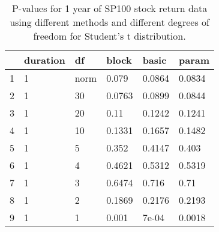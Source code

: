 \begin{table}[ht]
\centering
\caption{P-values for 1 year of SP100 stock return data using different 
  methods
  and different degrees of freedom for Student's t distribution.} 
\label{table:SP1001}
\begin{tabular}{rlllll}
  \hline
 & duration & df & block & basic & param \\ 
  \hline
1 & 1 & norm & 0.079 & 0.0864 & 0.0834 \\ 
  2 & 1 & 30 & 0.0763 & 0.0899 & 0.0844 \\ 
  3 & 1 & 20 & 0.11 & 0.1242 & 0.1241 \\ 
  4 & 1 & 10 & 0.1331 & 0.1657 & 0.1482 \\ 
  5 & 1 & 5 & 0.352 & 0.4147 & 0.403 \\ 
  6 & 1 & 4 & 0.4621 & 0.5312 & 0.5319 \\ 
  7 & 1 & 3 & 0.6474 & 0.716 & 0.71 \\ 
  8 & 1 & 2 & 0.1869 & 0.2176 & 0.2193 \\ 
  9 & 1 & 1 & 0.001 & 7e-04 & 0.0018 \\ 
   \hline
\end{tabular}
\end{table}

